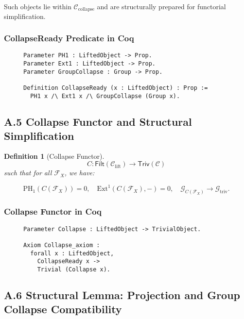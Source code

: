 \documentclass[11pt]{article}
\newtheorem{definition}[theorem]{Definition}
\begin{document}
Such objects lie within \( \mathcal{C}_{\mathrm{collapse}} \) and are structurally prepared for functorial simplification.

\subsubsection*{CollapseReady Predicate in Coq}

\begin{figure}[h]
\centering
\begin{lstlisting}[language=Coq, caption=Collapse-Readiness Predicate]
Parameter PH1 : LiftedObject -> Prop.
Parameter Ext1 : LiftedObject -> Prop.
Parameter GroupCollapse : Group -> Prop.

Definition CollapseReady (x : LiftedObject) : Prop :=
  PH1 x /\ Ext1 x /\ GroupCollapse (Group x).
\end{lstlisting}
\end{figure}

\subsection*{A.5 Collapse Functor and Structural Simplification}

\begin{definition}[Collapse Functor]
\[
C : \mathsf{Filt}(\mathcal{C}_{\mathrm{lift}}) \longrightarrow \mathsf{Triv}(\mathcal{C})
\]
such that for all \( \mathcal{F}_X \), we have:

\[
\mathrm{PH}_1(C(\mathcal{F}_X)) = 0, \quad \mathrm{Ext}^1(C(\mathcal{F}_X), -) = 0, \quad \mathcal{G}_{C(\mathcal{F}_X)} \longrightarrow \mathcal{G}_{\mathrm{triv}}.
\]
\end{definition}


\subsubsection*{Collapse Functor in Coq}

\begin{figure}[h]
\centering
\begin{lstlisting}[language=Coq, caption=Collapse Functor Axiom]
Parameter Collapse : LiftedObject -> TrivialObject.

Axiom Collapse_axiom :
  forall x : LiftedObject,
    CollapseReady x ->
    Trivial (Collapse x).
\end{lstlisting}
\end{figure}

\subsection*{A.6 Structural Lemma: Projection and Group Collapse Compatibility}
\end{document}
